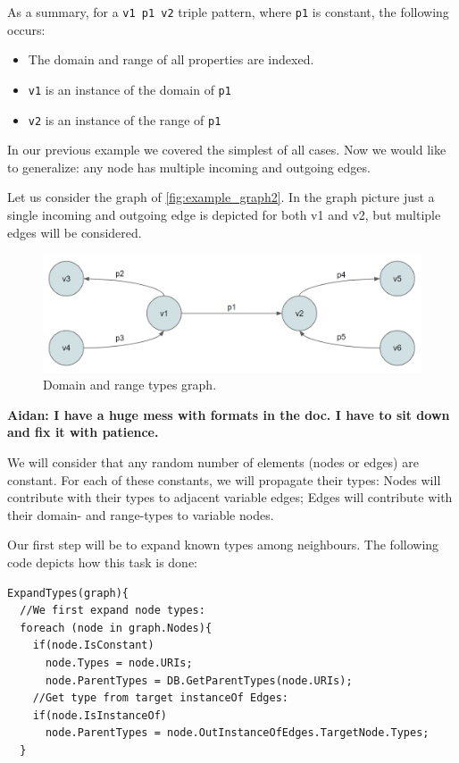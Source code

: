 As a summary, for a \texttt{v1 p1 v2} triple pattern, where \texttt{p1} is constant, the following occurs:
\begin{itemize}
    \item The domain and range of all properties are indexed.
    \item \texttt{v1} is an instance of the domain of \texttt{p1}
    \item \texttt{v2} is an instance of the range of \texttt{p1}
\end{itemize}

In our previous example we covered the simplest of all cases. Now we would like to generalize: any node has multiple incoming and outgoing edges.

\begin{example}

Let us consider the graph of \autoref{fig:example_graph2}. In the graph picture just a single incoming and outgoing edge is depicted for both v1 and v2, but multiple edges will be considered.

\begin{figure}[H]
    \centering
        \includegraphics[width=\linewidth]{imagenes/graph2.png}
        \caption{Domain and range types graph.}
        \label{fig:example_graph2}
\end{figure}

\textbf{Aidan: I have a huge mess with formats in the doc. I have to sit down and fix it with patience.}

We will consider that any random number of elements (nodes or edges) are constant. For each of these constants, we will propagate their types: Nodes will contribute with their types to adjacent variable edges; Edges will contribute with their domain- and range-types to variable nodes.

Our first step will be to expand known types among neighbours. The following code depicts how this task is done:

\begin{verbatim}
ExpandTypes(graph){
  //We first expand node types:
  foreach (node in graph.Nodes){
    if(node.IsConstant)
      node.Types = node.URIs;
      node.ParentTypes = DB.GetParentTypes(node.URIs);
    //Get type from target instanceOf Edges:
    if(node.IsInstanceOf) 
      node.ParentTypes = node.OutInstanceOfEdges.TargetNode.Types;
  }


\end{verbatim}
\end{example}
